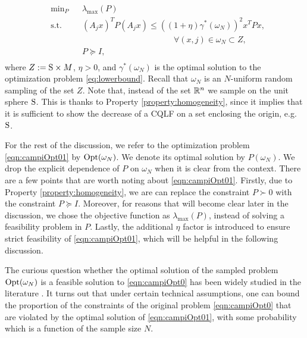 \begin{equation}\label{eqn:campiOpt01}
\begin{aligned}
& \text{min}_{P} & & \lambda_{\max}(P) \\
& \text{s.t.} 
&  & (A_j x)^TP(A_j x) \leq {((1 +\eta)\gamma^*(\omega_N))}^2 x^TPx,\\
&&&\qquad \qquad \qquad \qquad \quad \qquad \forall (x, j) \in \omega_N \subset Z, \\
& && P \succeq I, \\
\end{aligned}
\end{equation}
where $Z:=\text{S} \times M$, $\eta > 0$, and $\gamma^*(\omega_N)$ is the optimal solution to the optimization problem \eqref{eq:lowerbound}. Recall that $\omega_N$ is an $N$-uniform random sampling of the set $Z$. Note that, instead of the set $\mathbb{R}^n$ we sample on the unit sphere $\text{S}$. This is thanks to Property \ref{property:homogeneity}, since it implies that it is sufficient to show the decrease of a CQLF on a set enclosing the origin, e.g. $\text{S}$.

For the rest of the discussion, we refer to the optimization problem \eqref{eqn:campiOpt01} by $ \text{Opt}(\omega_N)$. We denote its optimal solution by $P(\omega_N)$. We drop the explicit dependence of $P$ on $\omega_N$ when it is clear from the context. There are a few points that are worth noting about \eqref{eqn:campiOpt01}. Firstly, due to Property \ref{property:homogeneity}, we are can replace the constraint $P \succ 0$ with the constraint $P \succeq I$. Moreover, for reasons that will become clear later in the discussion, we chose the objective function as $\lambda_{\max}(P)$, instead of solving a feasibility problem in $P$. Lastly, the additional $\eta$ factor is introduced to ensure strict feasibility of \eqref{eqn:campiOpt01}, which will be helpful in the following discussion.

The curious question whether the optimal solution of the sampled problem $\text{Opt}(\omega_N)$ is a feasible solution to \eqref{eqn:campiOpt0} has been widely studied in the literature \cite{campi}. It turns out that under certain technical assumptions, one can bound the proportion of the constraints of the original problem \eqref{eqn:campiOpt0} that are violated by the optimal solution of \eqref{eqn:campiOpt01}, with some probability which is a function of the sample size $N$. 

